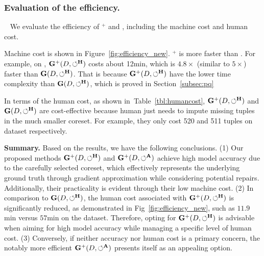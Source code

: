 \subsubsection{Evaluation of the efficiency.}~\label{sec:exp:efficiency_g} We  evaluate the efficiency of \ours$^+$ and \ours, including the machine cost and human cost.

 Machine cost is shown  in Figure~\ref{fig:efficiency_new}.  \ours$^+$ is more faster than \ours. For example, on \imdbl, $\mathbf{G}^+(D,\circlearrowleft^\mathbf{H})$ costs about 12min, which is $4.8\times$ (similar to $5\times$) faster than $\mathbf{G}(D,\circlearrowleft^\mathbf{H})$. That is because $\mathbf{G}^+(D,\circlearrowleft^\mathbf{H})$ have the lower time complexity than $\mathbf{G}(D,\circlearrowleft^\mathbf{H})$, which is proved in Section~\ref{subsec:pq}


 In terms of the human cost, as shown in~Table~\ref{tbl:humancost}, $\mathbf{G}^+(D,\circlearrowleft^\mathbf{H})$ and $\mathbf{G}(D,\circlearrowleft^\mathbf{H})$ are cost-effective because human just needs to impute missing tuples in the much smaller coreset. For example, they only cost 520 and 511 tuples on dataset \imdbl respectively. 

\noindent \textbf{Summary.} 
Based on the results, we have the following conclusions.
(1) Our proposed methods $\mathbf{G}^+(D,\circlearrowleft^\mathbf{H})$ and $\mathbf{G}^+(D,\circlearrowleft^\mathbf{A})$ achieve high model accuracy due to the carefully selected coreset, which effectively represents the underlying ground truth through gradient approximation while considering potential repairs. Additionally, their practicality is evident through their low machine cost. (2) In comparison to $\mathbf{G}(D,\circlearrowleft^\mathbf{H})$, the human cost associated with $\mathbf{G}^+(D,\circlearrowleft^\mathbf{H})$ is significantly reduced, as demonstrated in Fig~\ref{fig:efficiency_new}, such as $11.9$min versus $57$min on the \imdbl dataset. Therefore, opting for $\mathbf{G}^+(D,\circlearrowleft^\mathbf{H})$ is advisable when aiming for high model accuracy while managing a specific level of human cost. (3) Conversely, if neither accuracy nor human cost is a primary concern, the notably more efficient $\mathbf{G}^+(D,\circlearrowleft^\mathbf{A})$ presents itself as an appealing option.
